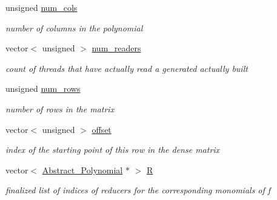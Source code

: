 \begin{DoxyCompactItemize}
unsigned \hyperlink{group___g_b_computation_a89273e870d32497bb2a45fb74461194e}{num\+\_\+cols}
\begin{DoxyCompactList}\small\item\em number of columns in the polynomial \end{DoxyCompactList}\item 
\mbox{\label{group___g_b_computation_ac160863a9b65b41bb6069740ca883da8}} 
vector$<$ unsigned $>$ \hyperlink{group___g_b_computation_ac160863a9b65b41bb6069740ca883da8}{num\+\_\+readers}
\begin{DoxyCompactList}\small\item\em count of threads that have actually read a generated actually built \end{DoxyCompactList}\item 
\mbox{\label{group___g_b_computation_a4c95ce9de848b6a4312ae19fef8980b3}} 
unsigned \hyperlink{group___g_b_computation_a4c95ce9de848b6a4312ae19fef8980b3}{num\+\_\+rows}
\begin{DoxyCompactList}\small\item\em number of rows in the matrix \end{DoxyCompactList}\item 
\mbox{\label{group___g_b_computation_a5686aed4d209fd6e2596b19e060d3c29}} 
vector$<$ unsigned $>$ \hyperlink{group___g_b_computation_a5686aed4d209fd6e2596b19e060d3c29}{offset}
\begin{DoxyCompactList}\small\item\em index of the starting point of this row in the dense matrix \end{DoxyCompactList}\item 
\mbox{\label{group___g_b_computation_a90488d65365fd6a5512ccda45780acc5}} 
vector$<$ \hyperlink{group__polygroup_class_abstract___polynomial}{Abstract\+\_\+\+Polynomial} $\ast$ $>$ \hyperlink{group___g_b_computation_a90488d65365fd6a5512ccda45780acc5}{R}
\begin{DoxyCompactList}\small\item\em finalized list of indices of reducers for the corresponding monomials of {\ttfamily f} \end{DoxyCompactList}\item 
\mbox{\label{group___g_b_computation_ae715f7601d5f828b58f59c8ef15748fb}} 

\end{DoxyCompactItemize}
